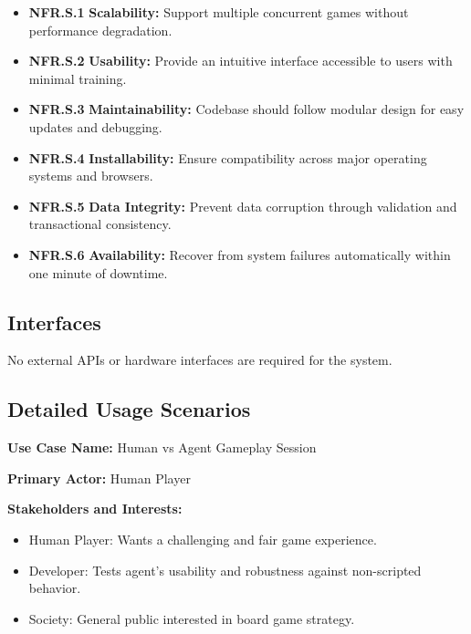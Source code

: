 \documentclass{article}
\begin{document}
\begin{itemize}
  \item \label{NFR.S.1}\textbf{NFR.S.1} \textbf{Scalability:} Support multiple concurrent games without
        performance degradation.
  \item \label{NFR.S.2}\textbf{NFR.S.2} \textbf{Usability:} Provide an intuitive interface accessible to users
        with minimal training.
  \item \label{NFR.S.3}\textbf{NFR.S.3} \textbf{Maintainability:} Codebase should follow modular design for easy
        updates and debugging.
  \item \label{NFR.S.4}\textbf{NFR.S.4} \textbf{Installability:} Ensure compatibility across major operating systems
        and browsers.
  \item \label{NFR.S.5}\textbf{NFR.S.5} \textbf{Data Integrity:} Prevent data corruption through validation and
        transactional consistency.
  \item \label{NFR.S.6}\textbf{NFR.S.6} \textbf{Availability:} Recover from system failures automatically within
        one minute of downtime.
\end{itemize}


\subsection{Interfaces}\label{subsec:interfaces}

No external APIs or hardware interfaces are required for the system.

\subsection{Detailed Usage Scenarios}\label{subsec:detailed-usage-scenarios}

\noindent\textbf{Use Case Name:} Human vs \RL{} Agent Gameplay Session

\noindent\textbf{Primary Actor:} Human Player

\noindent\textbf{Stakeholders and Interests:}
\begin{itemize}
    \item Human Player: Wants a challenging and fair game experience.
    \item Developer: Tests agent's usability and robustness against non-scripted behavior.
    \item Society: General public interested in board game strategy.
\end{itemize}
\end{document}
